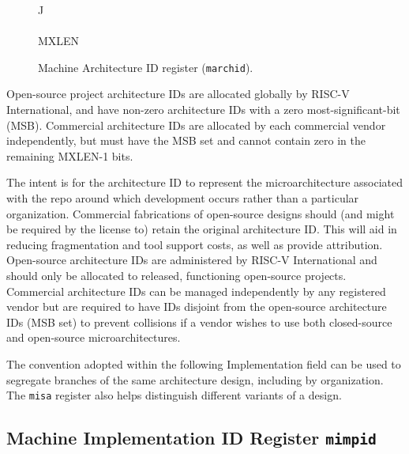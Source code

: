 \begin{figure}[h!]
{\footnotesize
\begin{center}
\begin{tabular}{J}
 \\
\hline
{} \\
\hline
MXLEN \\
\end{tabular}
\end{center}
}
\vspace{-0.1in}
\caption{Machine Architecture ID register ({\tt marchid}).}
\label{marchreg}
\end{figure}

Open-source project architecture IDs are allocated globally by
RISC-V International, and have non-zero architecture IDs with a zero
most-significant-bit (MSB).  Commercial architecture IDs are allocated
by each commercial vendor independently, but must have the MSB set and
cannot contain zero in the remaining MXLEN-1 bits.

\begin{commentary}
The intent is for the architecture ID to represent the
microarchitecture associated with the repo around which development
occurs rather than a particular organization.  Commercial fabrications
of open-source designs should (and might be required by the license
to) retain the original architecture ID.  This will aid in reducing
fragmentation and tool support costs, as well as provide attribution.
Open-source architecture IDs are administered by RISC-V International
and should only be allocated to released, functioning open-source
projects.  Commercial architecture IDs can be managed independently by
any registered vendor but are required to have IDs disjoint from the
open-source architecture IDs (MSB set) to prevent collisions if a
vendor wishes to use both closed-source and open-source
microarchitectures.

The convention adopted within the following Implementation field can
be used to segregate branches of the same architecture design,
including by organization.  The {\tt misa} register also helps
distinguish different variants of a design.
\end{commentary}

\subsection{Machine Implementation ID Register {\tt mimpid}}

